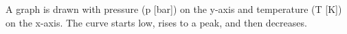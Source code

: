A graph is drawn with pressure (p [bar]) on the y-axis and temperature (T [K]) on the x-axis. The curve starts low, rises to a peak, and then decreases.